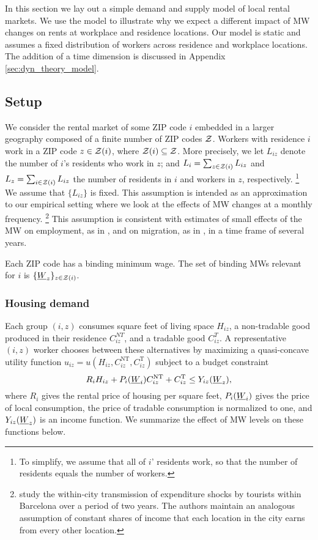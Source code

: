 
In this section we lay out a simple demand and supply model of local rental markets.
We use the model to illustrate why we expect a different impact of MW changes 
on rents at workplace and residence locations.
Our model is static and assumes a fixed distribution of workers across 
residence and workplace locations.
The addition of a time dimension is discussed in Appendix 
\ref{sec:dyn_theory_model}.

\subsection{Setup}

We consider the rental market of some ZIP code $i$ embedded in a larger geography 
composed of a finite number of ZIP codes $\mathcal{Z}$.
Workers with residence $i$ work in a ZIP code $z\in\mathcal{Z}(i)$, where 
$\mathcal{Z}(i)\subseteq\mathcal{Z}$.
More precisely, we let $L_{iz}$ denote the number of $i$'s residents who work 
in $z$; and 
$L_i = \sum_{z \in \mathcal{Z}(i)} L_{iz}$ and $L_z = \sum_{i \in \mathcal{Z}(i)} L_{iz}$ the 
number of residents in $i$ and workers in $z$, respectively.%
\footnote{To simplify, we assume that all of $i$' residents work, so that the 
number of residents equals the number of workers.}
We assume that $\{L_{iz}\}$ is fixed.
This assumption is intended as an approximation to our empirical setting where 
we look at the effects of MW changes at a monthly frequency.%
\footnote{\textcite{AllenEtAl2020} study the within-city transmission of 
expenditure shocks by tourists within Barcelona over a period of two years.
The authors maintain an analogous assumption of constant shares of income that
each location in the city earns from every other location.}
This assumption is consistent with estimates of small effects of the MW on 
employment, as in \textcite{CegnizEtAl2019, DustmannEtAl2022}, and 
on migration, as in \textcite{PerezPerez2021}, 
in a time frame of several years.

Each ZIP code has a binding minimum wage.
The set of binding MWs relevant for $i$ is $\{\underline{W}_z\}_{z\in\mathcal{Z}(i)}$.

\subsubsection*{Housing demand}

Each group $(i,z)$ consumes
square feet of living space $H_{iz}$, 
a non-tradable good produced in their residence $C_{iz}^{NT}$, and
a tradable good $C_{iz}^T$.
A representative $(i,z)$ worker chooses between these alternatives by maximizing
a quasi-concave utility function 
$u_{iz} = u \left(H_{iz}, C^{\text{NT}}_{iz}, C^{\text{T}}_{iz}\right)$
subject to a budget constraint
$$R_i H_{iz} + P_i(\underline{W}_i) C^{\text{NT}}_{iz} + C^{\text{T}}_{iz} \leq Y_{iz}(\underline{W}_z),$$
where
$R_i$ gives the rental price of housing per square feet,
$P_i(\underline{W}_i)$ gives the price of local consumption,
the price of tradable consumption is normalized to one, and 
$Y_{iz}(\underline{W}_z)$ is an income function.
We summarize the effect of MW levels on these functions below.


